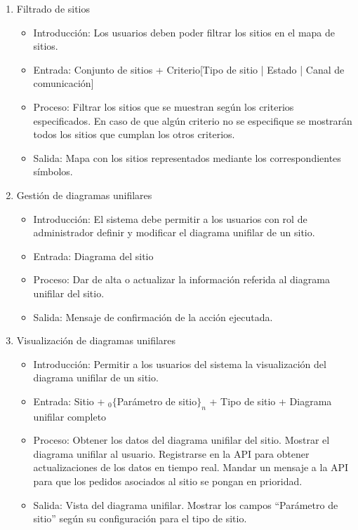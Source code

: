 \begin{enumerate}
			\item Filtrado de sitios
				\begin{itemize}
					\item Introducción: Los usuarios deben poder filtrar los sitios en el mapa de sitios.
					\item Entrada: Conjunto de sitios + Criterio[Tipo de sitio | Estado | Canal de comunicación]
					\item Proceso: Filtrar los sitios que se muestran según los criterios especificados. En caso de que algún criterio no se especifique se mostrarán todos los sitios que cumplan los otros criterios.
					\item Salida: Mapa con los sitios representados mediante los correspondientes símbolos.
				\end{itemize}
				
			\item Gestión de diagramas unifilares
				\begin{itemize}
					\item Introducción: El sistema debe permitir a los usuarios con rol de administrador definir y modificar el diagrama unifilar de un sitio.
					\item Entrada: Diagrama del sitio
					\item Proceso: Dar de alta o actualizar la información referida al diagrama unifilar del sitio.
					\item Salida: Mensaje de confirmación de la acción ejecutada.
				\end{itemize}
				
			\item Visualización de diagramas unifilares
				\begin{itemize}
					\item Introducción: Permitir a los usuarios del sistema la visualización del diagrama unifilar de un sitio.
					\item Entrada: Sitio + ${}_{0}\{$Parámetro de sitio$\}_n$ + Tipo de sitio + Diagrama unifilar completo
					\item Proceso: Obtener los datos del diagrama unifilar del sitio. Mostrar el diagrama unifilar al usuario. Registrarse en la API para obtener actualizaciones de los datos en tiempo real. Mandar un mensaje a la API para que los pedidos asociados al sitio se pongan en prioridad.
					\item Salida: Vista del diagrama unifilar. Mostrar los campos ``Parámetro de sitio'' según su configuración para el tipo de sitio.
				\end{itemize}
	

\end{enumerate}
